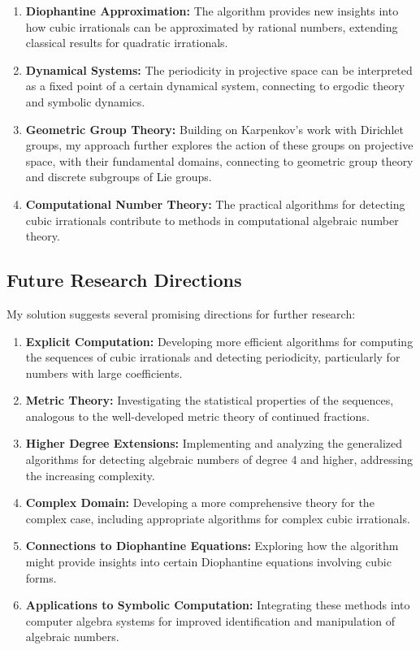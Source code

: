 \begin{enumerate}
    \item \textbf{Diophantine Approximation:} The \HAPD{} algorithm provides new insights into how cubic irrationals can be approximated by rational numbers, extending classical results for quadratic irrationals.
    
    \item \textbf{Dynamical Systems:} The periodicity in projective space can be interpreted as a fixed point of a certain dynamical system, connecting to ergodic theory and symbolic dynamics.
    
    \item \textbf{Geometric Group Theory:} Building on Karpenkov's work with Dirichlet groups, my approach further explores the action of these groups on projective space, with their fundamental domains, connecting to geometric group theory and discrete subgroups of Lie groups.
    
    \item \textbf{Computational Number Theory:} The practical algorithms for detecting cubic irrationals contribute to methods in computational algebraic number theory.
\end{enumerate}

\subsection{Future Research Directions}

My solution suggests several promising directions for further research:

\begin{enumerate}
    \item \textbf{Explicit Computation:} Developing more efficient algorithms for computing the \HAPD{} sequences of cubic irrationals and detecting periodicity, particularly for numbers with large coefficients.
    
    \item \textbf{Metric Theory:} Investigating the statistical properties of the \HAPD{} sequences, analogous to the well-developed metric theory of continued fractions.
    
    \item \textbf{Higher Degree Extensions:} Implementing and analyzing the generalized algorithms for detecting algebraic numbers of degree 4 and higher, addressing the increasing complexity.
    
    \item \textbf{Complex Domain:} Developing a more comprehensive theory for the complex case, including appropriate algorithms for complex cubic irrationals.
    
    \item \textbf{Connections to Diophantine Equations:} Exploring how the \HAPD{} algorithm might provide insights into certain Diophantine equations involving cubic forms.
    
    \item \textbf{Applications to Symbolic Computation:} Integrating these methods into computer algebra systems for improved identification and manipulation of algebraic numbers.
\end{enumerate}

